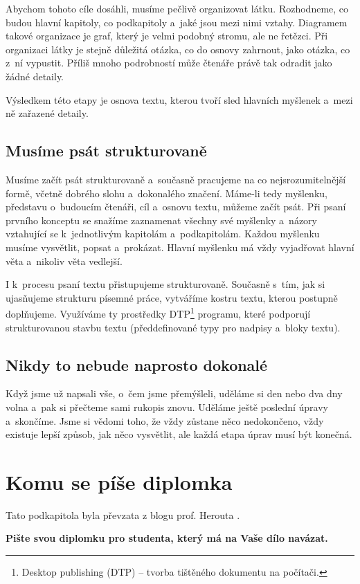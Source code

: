 Abychom tohoto cíle dosáhli, musíme pečlivě organizovat látku. Rozhodneme, co budou hlavní kapitoly, co podkapitoly a~jaké jsou mezi nimi vztahy. Diagramem takové organizace je graf, který je velmi podobný stromu, ale ne řetězci. Při organizaci látky je stejně důležitá otázka, co do osnovy zahrnout, jako otázka, co z~ní vypustit. Příliš mnoho podrobností může čtenáře právě tak odradit jako žádné detaily.

Výsledkem této etapy je osnova textu, kterou tvoří sled hlavních myšlenek a~mezi ně zařazené detaily.

\subsection*{Musíme psát strukturovaně}
Musíme začít psát strukturovaně a~současně pracujeme na co nejsrozumitelnější formě, včetně dobrého slohu a~dokonalého značení.
Máme-li tedy myšlenku, představu o~budoucím čtenáři, cíl a~osnovu textu, můžeme začít psát. Při psaní prvního konceptu se snažíme zaznamenat všechny své myšlenky a~názory vztahující se k~jednotlivým kapitolám a~podkapitolám. Každou myšlenku musíme vysvětlit, popsat a~prokázat. Hlavní myšlenku má vždy vyjadřovat hlavní věta a~nikoliv věta vedlejší.

I k~procesu psaní textu přistupujeme strukturovaně. Současně s~tím, jak si ujasňujeme strukturu písemné práce, vytváříme kostru textu, kterou postupně doplňujeme. Využíváme ty prostředky DTP\footnote{Desktop publishing (DTP) -- tvorba tištěného dokumentu na počítači.} programu, které podporují strukturovanou stavbu textu (předdefinované typy pro nadpisy a~bloky textu).

\subsection*{Nikdy to nebude naprosto dokonalé}
Když jsme už napsali vše, o~čem jsme přemýšleli, uděláme si den nebo dva dny volna a~pak si přečteme sami rukopis znovu. Uděláme ještě poslední úpravy a~skončíme. Jsme si vědomi toho, že vždy zůstane něco nedokončeno, vždy existuje lepší způsob, jak něco vysvětlit, ale každá etapa úprav musí být konečná.

\section{Komu se píše diplomka}
Tato podkapitola byla převzata z blogu prof. Herouta \cite{Herout}.

\bigskip
\noindent \bf Pište svou diplomku pro studenta, který má na Vaše dílo navázat. \rm
\bigskip

